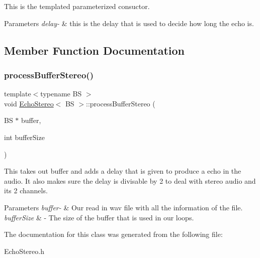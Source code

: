 This is the templated parameterized consuctor. 
\begin{DoxyParams}{Parameters}
{\em delay-\/} & this is the delay that is used to decide how long the echo is. \\
\hline
\end{DoxyParams}


\subsection{Member Function Documentation}
\mbox{\label{classEchoStereo_a1b3ab691e0a48056f116d555a2fb969d}} 
\subsubsection{\texorpdfstring{process\+Buffer\+Stereo()}{processBufferStereo()}}
{\footnotesize\ttfamily template$<$typename BS $>$ \\
void \hyperlink{classEchoStereo}{Echo\+Stereo}$<$ BS $>$\+::process\+Buffer\+Stereo (\begin{DoxyParamCaption}\item[{BS $\ast$}]{buffer,  }\item[{int}]{buffer\+Size }\end{DoxyParamCaption})}

This takes out buffer and adds a delay that is given to produce a echo in the audio. It also makes sure the delay is divisable by 2 to deal with stereo audio and its 2 channels. 
\begin{DoxyParams}{Parameters}
{\em buffer-\/} & Our read in wav file with all the information of the file. \\
\hline
{\em buffer\+Size} & -\/ The size of the buffer that is used in our loops. \\
\hline
\end{DoxyParams}


The documentation for this class was generated from the following file\+:\begin{DoxyCompactItemize}
\item 
Echo\+Stereo.\+h\end{DoxyCompactItemize}
